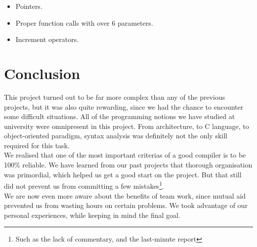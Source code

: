 \documentclass{scrartcl}
\begin{document}
\begin{itemize}
\item Pointers.
\item Proper function calls with over 6 parameters.
\item Increment operators.
\end{itemize}

\section{Conclusion}
This project turned out to be far more complex than any of the previous projects, but it was also quite rewarding, since we had the chance to encounter some difficult situations. All of the programming notions we have studied at university were omnipresent in this project. From architecture, to C language, to object-oriented paradigm, syntax analysis was definitely not the only skill required for this task.\\

We realised that one of the most important criterias of a good compiler is to be 100\% reliable.
We have learned from our past projects that thorough organisation was primordial, which helped us get a good start on the project. But that still did not prevent us from committing a few mistakes\footnote{Such as the lack of commentary, and the last-minute report}.\\

We are now even more aware about the benefits of team work, since mutual aid prevented us from wasting hours on certain problems. We took advantage of our personal experiences, while keeping in mind the final goal.
\end{document}
